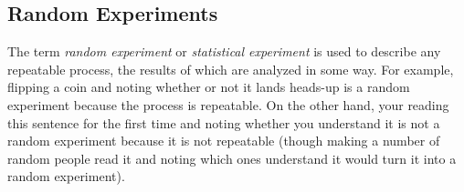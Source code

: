             \subsection{ Random Experiments}
            \nopagebreak
      \label{m39377*id110059}The term \textsl{random
experiment} or \textsl{statistical
experiment} is used to describe any repeatable process, the results of
which are analyzed in some way. For example, flipping a coin and noting whether
or not it lands heads-up is a random experiment because the process is
repeatable. On the other hand, your reading this sentence for the first time and
noting whether you understand it is not a random experiment because it is not
repeatable (though making a number of random people read it and noting which
ones understand it would turn it into a random experiment).\par 
\label{m39377*id7342}
